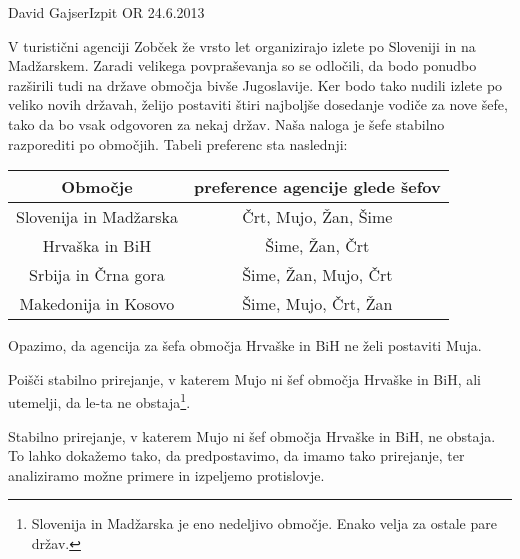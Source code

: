 \begin{naloga}{David Gajser}{Izpit OR 24.6.2013}
\begin{vprasanje}
V turistični agenciji Zobček že vrsto let
organizirajo izlete po Sloveniji in na Madžarskem.
Zaradi velikega povpraševanja so se odločili,
da bodo ponudbo razširili tudi na države območja bivše Jugoslavije.
Ker bodo tako nudili izlete po veliko novih državah,
želijo postaviti štiri najboljše dosedanje vodiče za nove šefe,
tako da bo vsak odgovoren za nekaj držav.
Naša naloga je šefe stabilno razporediti po območjih.
Tabeli preferenc sta naslednji:
\begin{center}

\bigskip
\begin{tabular}{c|c}
Območje                & preference agencije glede šefov \\ \hline
Slovenija in Madžarska & Črt, Mujo, Žan, Šime \\
Hrvaška in BiH         & Šime, Žan, Črt \\
Srbija in Črna gora    & Šime, Žan, Mujo, Črt \\
Makedonija in Kosovo   & Šime, Mujo, Črt, Žan
\end{tabular}
\end{center}
Opazimo, da agencija za šefa območja Hrvaške in BiH ne želi postaviti Muja.

Poišči stabilno prirejanje, v katerem Mujo ni šef območja Hrvaške in BiH,
ali utemelji, da le-ta ne obstaja\footnote{
Slovenija in Madžarska je eno nedeljivo območje.
Enako velja za ostale pare držav.
}.
\end{vprasanje}

\begin{odgovor}
Stabilno prirejanje, v katerem Mujo ni šef območja Hrvaške in BiH, ne obstaja.
To lahko dokažemo tako, da predpostavimo, da imamo tako prirejanje,
ter analiziramo možne primere in izpeljemo protislovje.


\end{odgovor}
\end{naloga}
